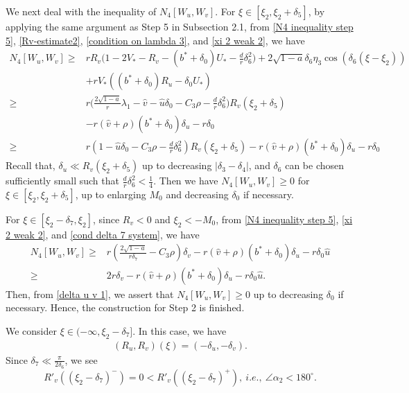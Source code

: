\documentclass[11pt,a4paper]{article}
\numberwithin{equation}{section}
\numberwithin{figure}{section}
\newcommand\beaa{\begin{eqnarray*}}
\newcommand\eeaa{\end{eqnarray*}}
\begin{document}
We next deal with the inequality of $N_4[W_u,W_v]$. For $\xi\in[\xi_2,\xi_2+\delta_5]$, by applying the same argument as Step 5 in Subsection 2.1, from \eqref{N4 inequality step 5}, \eqref{Rv-estimate2}, \eqref{condition on lambda 3}, and \eqref{xi 2 weak 2}, we have
\begin{equation*}
\begin{aligned}
N_4[W_u,W_v]\ge & rR_v\Big(1-2V_*-R_v-(b^*+\delta_0)U_*-\frac{d}{r}\delta_6^2\Big)+2\sqrt{1-a}\delta_6\eta_3\cos(\delta_6(\xi-\xi_2))\\
&+rV_*((b^*+\delta_0)R_u-\delta_0U_*)\\
\ge &r\Big(\frac{2\sqrt{1-a}}{r}\lambda_1-\hat v-\hat u\delta_0-C_3\rho-\frac{d}{r}\delta_6^2\Big)R_v(\xi_2+\delta_5)\\
&-r(\hat v+\rho)(b^*+\delta_0)\delta_u-r\delta_0\\
\ge & r(1-\hat u\delta_0-C_3\rho-\frac{d}{r}\delta_6^2)R_v(\xi_2+\delta_5)-r(\hat v+\rho)(b^*+\delta_0)\delta_u-r\delta_0
\end{aligned}
\end{equation*}
Recall that,
$\delta_u\ll R_v(\xi_2+\delta_5)$ up to decreasing $|\delta_3-\delta_4|$, and $\delta_6$ can be chosen sufficiently small such that $\frac{d}{r}\delta_6^2<\frac{1}{4}$. Then we have $N_4[W_u,W_v]\ge 0$ for $\xi\in[\xi_2,\xi_2+\delta_5]$, up to enlarging $M_0$ and decreasing $\delta_0$ if necessary.

For $\xi\in[\xi_2-\delta_7,\xi_2]$, since $R_v<0$ and $\xi_2<-M_0$, from \eqref{N4 inequality step 5}, \eqref{xi 2 weak 2}, and \eqref{cond delta 7 system}, we have
\begin{equation*}
\begin{aligned}
N_4[W_u,W_v]\ge & r(\frac{2\sqrt{1-a}}{r\delta_7}-C_3\rho)\delta_v-r(\hat v+\rho)(b^*+\delta_0)\delta_u-r\delta_0\hat u\\
\ge & 2r\delta_v-r(\hat v+\rho)(b^*+\delta_0)\delta_u-r\delta_0\hat u.
\end{aligned}
\end{equation*}
Then, from \eqref{delta u v 1}, we assert that $N_4[W_u,W_v]\ge 0$
up to decreasing $\delta_0$ if necessary.
Hence, the construction for Step 2 is finished.

\medskip

 We consider $\xi\in(-\infty,\xi_2-\delta_7]$.
In this case, we have
\beaa
(R_u,R_v)(\xi)=(-\delta_u,-\delta_v).
\eeaa
Since $\delta_7\ll\frac{\pi}{2\delta_6}$, we see 
$$R'_v((\xi_2-\delta_7)^-)=0<R'_v((\xi_2-\delta_7)^+),\ i.e.,\ \angle\alpha_2<180^{\circ}.$$
\end{document}
